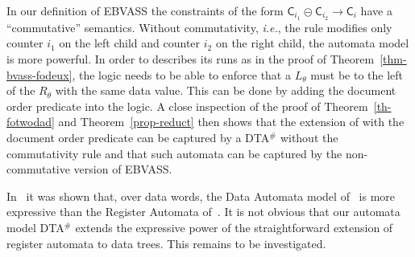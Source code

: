 \documentclass{CSML}
\newcommand\ebvass{\textup{EBVASS}\xspace}
\newcommand\dad{\textup{DTA}$^\#$\xspace}
\newcommand\merc[3]{\mathsf{C}_{#1}\mathpunct{\circleddash}\mathsf{C}_{#2}\to\mathsf{C}_{#3}}
\begin{document}
In our definition of \ebvass the constraints of the form $\merc{i_1}{i_2}{i}$
have a ``commutative'' semantics. 
Without commutativity, \textit{i.e.}, the rule modifies
only counter $i_1$ on the left child and counter $i_2$ on the right child,
the automata model is more powerful. 
In order to describes its runs as in the
proof of Theorem~\ref{thm-bvass-fodeux}, the logic needs to be able to enforce
that a $L_\theta$ must be to the left of the $R_\theta$ with the same data value. 
This can be done by adding the document order predicate into the logic.
A close inspection of the proof of Theorem~\ref{th-fotwodad} and
Theorem~\ref{prop-reduct} then shows that the extension of \fotwo with the
document order predicate can be captured by a \dad without the commutativity
rule and that such automata can be captured by the non-commutative version of
\ebvass.


In~\cite{BjSch10} it was shown that, over data words, the Data Automata model
of~\cite{BDMSS11} is more expressive than the Register Automata
of~\cite{KF94}. It is not obvious that our automata model \dad extends the
expressive power of the straightforward extension of register automata to data
trees. This remains to be investigated.



 


 
\end{document}
